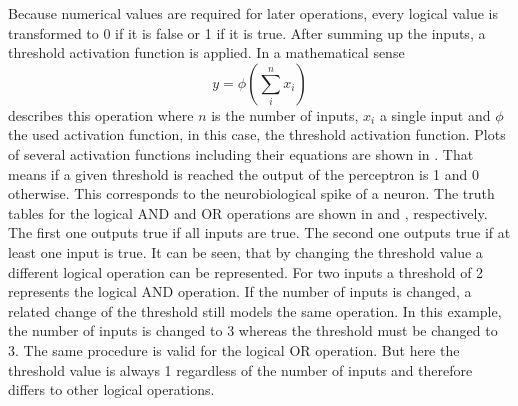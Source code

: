 Because numerical values are required for later operations, every logical value is transformed to 0 if it is false or 1 if it is true.
After summing up the inputs, a threshold activation function is applied.
In a mathematical sense
\begin{equation}
	\label{eq:neuron-mcculloch}
	y = \phi \left( \sum_{i}^{n} x_i \right)
\end{equation}
describes this operation where $n$ is the number of inputs, $x_i$ a single input and $\phi$ the used activation function, in this case, the threshold activation function.
Plots of several activation functions including their equations are shown in .
That means if a given threshold is reached the output of the perceptron is 1 and 0 otherwise.
This corresponds to the neurobiological spike of a neuron.
The truth tables for the logical AND and OR operations are shown in  and , respectively.
The first one outputs true if all inputs are true.
The second one outputs true if at least one input is true.
It can be seen, that by changing the threshold value a different logical operation can be represented.
For two inputs a threshold of 2 represents the logical AND operation.
If the number of inputs is changed, a related change of the threshold still models the same operation.
In this example, the number of inputs is changed to 3 whereas the threshold must be changed to 3.
The same procedure is valid for the logical OR operation.
But here the threshold value is always 1 regardless of the number of inputs and therefore differs to other logical operations.
